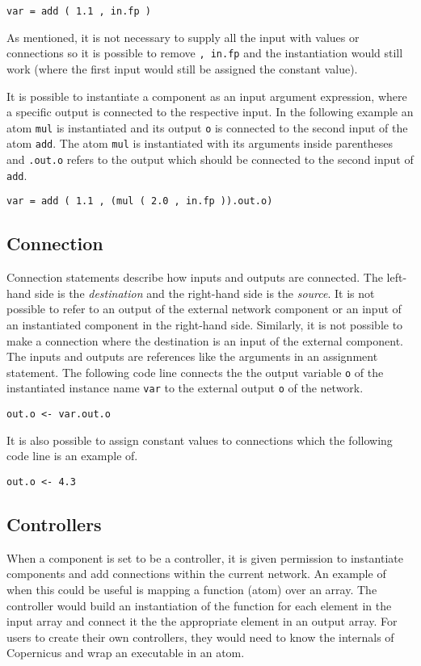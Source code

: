 \begin{verbatim}
var = add ( 1.1 , in.fp )
\end{verbatim}

As mentioned, it is not necessary to supply all the input with values
or connections so it is possible to remove \verb#, in.fp# and the
instantiation would still work (where the first input would still be
assigned the constant value).

It is possible to instantiate a component as an input argument
expression, where a specific output is connected to the respective
input. In the following example an atom \verb#mul# is instantiated and
its output \verb#o# is connected to the second input of the atom
\verb#add#. The atom \verb#mul# is instantiated with its arguments
inside parentheses and \verb#.out.o# refers to the output which should
be connected to the second input of \verb#add#.

\begin{verbatim}
var = add ( 1.1 , (mul ( 2.0 , in.fp )).out.o)
\end{verbatim}

\subsection{Connection}
Connection statements describe how inputs and outputs are
connected. The left-hand side is the \emph{destination} and the
right-hand side is the \emph{source}. It is not possible to refer to
an output of the external network component or an input of an
instantiated component in the right-hand side. Similarly, it is not
possible to make a connection where the destination is an input of the
external component. The inputs and outputs are references like the
arguments in an assignment statement. The following code line connects
the the output variable \verb#o# of the instantiated instance name
\verb#var# to the external output \verb#o# of the network.

\begin{verbatim}
out.o <- var.out.o
\end{verbatim}

It is also possible to assign constant values to connections which the
following code line is an example of.

\begin{verbatim}
out.o <- 4.3
\end{verbatim}


\subsection{Controllers} \label{sec:control}
When a component is set to be a controller, it is given permission to
instantiate components and add connections within the current
network. An example of when this could be useful is mapping a function
(atom) over an array. The controller would build an instantiation of
the function for each element in the input array and connect it the
the appropriate element in an output array. For users to create their
own controllers, they would need to know the internals of Copernicus
and wrap an executable in an atom.

